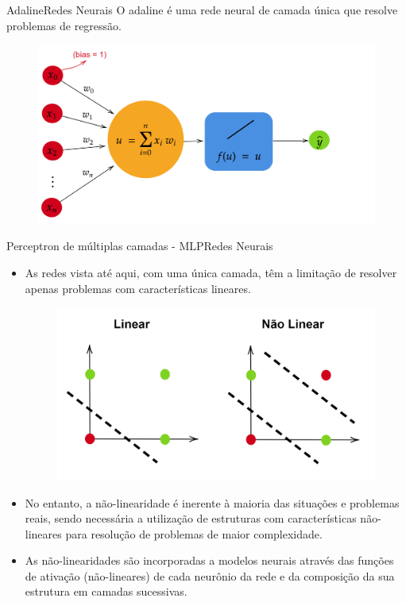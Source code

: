 \documentclass[t]{beamer}
\begin{document}
\begin{ftst}{Adaline}{Redes Neurais}
O adaline é uma rede neural de camada única que resolve problemas de regressão.

\begin{figure}
    \centering
    \includegraphics[scale=0.12]{Figuras/adaline.png}
    \label{fig:perceptron}
\end{figure}

\end{ftst}


\begin{ftst}{Perceptron de múltiplas camadas - MLP}{Redes Neurais}
\footnotesize
\begin{itemize}
    \item As redes vista até aqui, com uma única camada, têm a limitação de resolver apenas problemas com características lineares.
    \begin{figure}
        \centering
        \includegraphics[scale=0.1]{Figuras/nolinear.png}
    \end{figure}
    \item No entanto, a não-linearidade é inerente à maioria das situações e problemas reais, sendo necessária a utilização de estruturas com características não-lineares para resolução de problemas de maior complexidade.
    \vone
    \item As não-linearidades são incorporadas a modelos neurais através das funções de ativação (não-lineares) de cada neurônio da rede e da composição da sua estrutura em camadas sucessivas.
\end{itemize}

\end{ftst}
\end{document}
